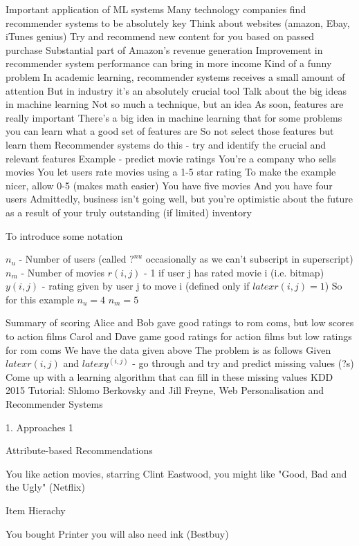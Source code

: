 Important application of ML systems
Many technology companies find recommender systems to be absolutely key
Think about websites (amazon, Ebay, iTunes genius)
Try and recommend new content for you based on passed purchase
Substantial part of Amazon's revenue generation
Improvement in recommender system performance can bring in more income
Kind of a funny problem
In academic learning, recommender systems receives a small amount of attention
But in industry it's an absolutely crucial tool
Talk about the big ideas in machine learning
Not so much a technique, but an idea
As soon, features are really important
There's a big idea in machine learning that for some problems you can learn what a good set of features are
So not select those features but learn them
Recommender systems do this - try and identify the crucial and relevant features
Example - predict movie ratings
You're a company who sells movies
You let users rate movies using a 1-5 star rating
To make the example nicer, allow 0-5 (makes math easier)
You have five movies
And you have four users
Admittedly, business isn't going well, but you're optimistic about the future as a result of your truly outstanding (if limited) inventory

To introduce some notation

$n_u$ - Number of users (called $?^{nu}$ occasionally as we can't subscript in superscript)
$n_m$ - Number of movies
$r(i, j)$ - 1 if user j has rated movie i (i.e. bitmap)
$y(i,j)$ - rating given by user j to move i (defined only if $latex r(i,j) = 1$)
So for this example
$n_u = 4$
$n_m = 5$

Summary of scoring
Alice and Bob gave good ratings to rom coms, but low scores to action films
Carol and Dave game good ratings for action films but low ratings for rom coms
We have the data given above
The problem is as follows
Given $latex r(i,j)$ and $latex y^{(i,j)}$ - go through and try and predict missing values (?s)
Come up with a learning algorithm that can fill in these missing values
KDD 2015 Tutorial: Shlomo Berkovsky and Jill Freyne, Web Personalisation and Recommender Systems

1. Approaches 1


Attribute-based Recommendations

You like action movies, starring Clint Eastwood, you might like "Good, Bad and the Ugly" (Netflix)

Item Hierachy

You bought Printer you will also need ink (Bestbuy)

